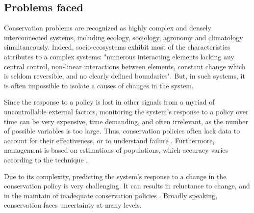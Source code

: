 \documentclass[12pt,a4paper]{article}
\begin{document}
\subsection{Problems faced}

Conservation problems are recognized as highly complex and densely interconnected systems, including ecology, sociology, agronomy and climatology simultaneously.
Indeed, socio-ecosystems exhibit most of the characteristics \cite{game2013conservation} attributes to a complex systems: "numerous interacting elements lacking any central control, non-linear interactions between elements, constant change which is seldom reversible, and no clearly defined boundaries".
But, in such systems, it is often impossible to isolate a causes of changes in the system.

Since the response to a policy is lost in other signals from a myriad of uncontrollable external factors, monitoring the system's response to a policy over time can be very expensive, time demanding, and often irrelevant, as the number of possible variables is too large.
Thus, conservation policies often lack data to account for their effectiveness, or to understand failure \citep{keith2011uncertainty}.
Furthermore, management is based on estimations of populations, which accuracy varies according to the technique \citep{BUNNEFELD2011441}.

Due to its complexity, predicting the system's response to a change in the conservation policy is very challenging.
It can results in reluctance to change, and in the maintain of inadequate conservation policies \citep{keith2011uncertainty, peterson2005conservation}.
Broadly speaking, conservation faces uncertainty at many levels.
\end{document}
